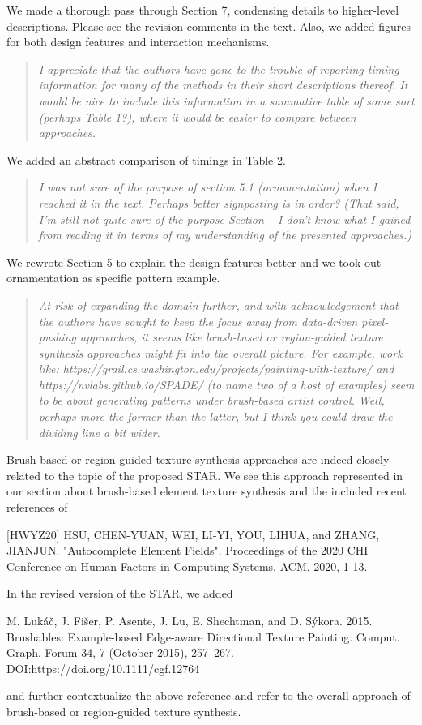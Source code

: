 \documentclass{egpubl}
\newcommand{\rev}[2]{{\color{greenrev}\textsuperscript{#1}#2}}
\renewcommand{\rev}[2]{{#2}}
\begin{document}
\rev{}{We made a thorough pass through Section 7, condensing details to higher-level descriptions. Please see the revision comments in the text. Also, we added figures for both design features and interaction mechanisms.}

\begin{quote}
\emph{I appreciate that the authors have gone to the trouble of reporting timing information for many of the methods in their short descriptions thereof. It would be nice to include this information in a summative table of some sort (perhaps Table 1?), where it would be easier to compare between approaches.}
\end{quote}


\rev{}{We added an abstract comparison of timings in Table 2.}

\begin{quote}
\emph{I was not sure of the purpose of section 5.1 (ornamentation) when I reached it in the text. Perhaps better signposting is in order? (That said, I'm still not quite sure of the purpose Section -- I don't know what I gained from reading it in terms of my understanding of the presented approaches.)}
\end{quote}

\rev{}{We rewrote Section 5 to explain the design features better and we took out ornamentation as specific pattern example.}

\begin{quote}
\emph{At risk of expanding the domain further, and with acknowledgement that the authors have sought to keep the focus away from data-driven pixel-pushing approaches,  it seems like brush-based or region-guided texture synthesis approaches might fit into the overall picture. For example, work like:
https://grail.cs.washington.edu/projects/painting-with-texture/
and https://nvlabs.github.io/SPADE/
(to name two of a host of examples)
seem to be about generating patterns under brush-based artist control. Well, perhaps more the former than the latter, but I think you could draw the dividing line a bit wider.}
\end{quote}

\rev{}{
    Brush-based or region-guided texture synthesis approaches are indeed closely related to the topic of the proposed STAR. We see this approach represented in our section about brush-based element texture synthesis and the included recent references of 

    [HWYZ20]  HSU, CHEN-YUAN, WEI, LI-YI, YOU, LIHUA, and ZHANG, JIANJUN. "Autocomplete Element Fields". Proceedings of the 2020 CHI Conference on Human Factors in Computing Systems. ACM, 2020, 1-13.

    In the revised version of the STAR, we added
    
    M. Lukáč, J. Fišer, P. Asente, J. Lu, E. Shechtman, and D. Sýkora. 2015. Brushables: Example-based Edge-aware Directional Texture Painting. Comput. Graph. Forum 34, 7 (October 2015), 257–267. DOI:https://doi.org/10.1111/cgf.12764
    
    and further contextualize the above reference and refer to the overall approach of brush-based or region-guided texture synthesis.
}
\end{document}
